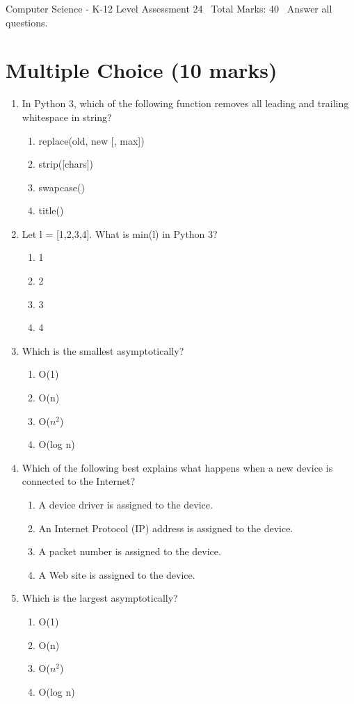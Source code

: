 \documentclass[12pt]{article}
\begin{document}
\begin{center}
Computer Science - K-12 Level Assessment 24 \
Total Marks: 40 \
Answer all questions.
\end{center}

\section*{Multiple Choice (10 marks)}
\begin{enumerate}[label=\arabic*.]
\item In Python 3, which of the following function removes all leading and trailing whitespace in string?
\begin{enumerate}[label=(\alph*)]
    \item replace(old, new [, max])
    \item strip([chars])
    \item swapcase()
    \item title()
\end{enumerate}
\item Let l = [1,2,3,4]. What is min(l) in Python 3?
\begin{enumerate}[label=(\alph*)]
    \item 1
    \item 2
    \item 3
    \item 4
\end{enumerate}
\item Which is the smallest asymptotically?
\begin{enumerate}[label=(\alph*)]
    \item O(1)
    \item O(n)
    \item O($n^2$)
    \item O(log n)
\end{enumerate}
\item Which of the following best explains what happens when a new device is connected to the Internet?
\begin{enumerate}[label=(\alph*)]
    \item A device driver is assigned to the device.
    \item An Internet Protocol (IP) address is assigned to the device.
    \item A packet number is assigned to the device.
    \item A Web site is assigned to the device.
\end{enumerate}
\item Which is the largest asymptotically?
\begin{enumerate}[label=(\alph*)]
    \item O(1)
    \item O(n)
    \item O($n^2$)
    \item O(log n)
\end{enumerate}
\end{enumerate}
\end{document}
